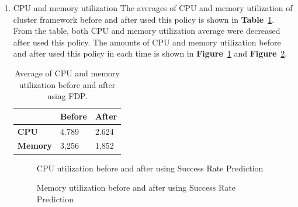 \documentclass[12pt,oneside,openright,a4paper]{cpe-english-project}
\begin{document}
\begin{enumerate}
  \item CPU and memory utilization
  \newline
  The averages of CPU and memory utilization of cluster framework before and after used this policy is shown in \textbf{Table}~\ref{tbl:po2CPUMem}. From the table, both CPU and memory utilization average were decreased after used this policy. The amounts of CPU and memory utilization before and after used this policy in each time is shown in \textbf{Figure}~\ref{fig:cpu2} and \textbf{Figure}~\ref{fig:mem2}. 
  \begin{table}[!h]
  \caption{Average of CPU and memory utilization before and after using FDP.}\label{tbl:po2CPUMem}
  \begin{tabular}{@{}|p{}|p{}|p{}|}
   \hline
   \textbf{} & \textbf{Before} & \textbf{After} \\ 
   \hline
   \textbf{CPU} & 4.789 & 2.624 \\ 
   \hline
   \textbf{Memory} & 3,256 & 1,852 \\ 
   \hline                     
  \end{tabular}
\end{table}
\begin{figure}[!h]\centering
    \setlength{\fboxrule}{0mm} %
    \setlength{\fboxsep}{0cm}
    \caption{CPU utilization before and after using Success Rate Prediction}\label{fig:cpu2}
\end{figure}
\begin{figure}[!h]\centering
    \setlength{\fboxrule}{0mm} %
    \setlength{\fboxsep}{0cm}
    \caption{Memory utilization before and after using Success Rate Prediction}\label{fig:mem2}
\end{figure}


\end{enumerate}
\end{document}
